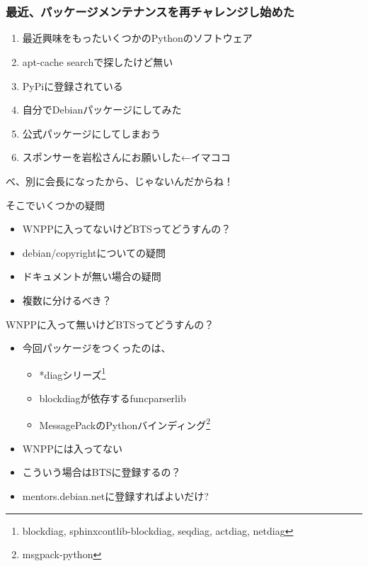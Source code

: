 \frame{\titlepage{}}

\section{}

\begin{frame}
 \frametitle{最近、パッケージメンテナンスを再チャレンジし始めた}
  \begin{enumerate}
   \item 最近興味をもったいくつかのPythonのソフトウェア
   \item apt-cache searchで探したけど無い
   \item PyPiに登録されている
   \item 自分でDebianパッケージにしてみた
   \item 公式パッケージにしてしまおう
   \item スポンサーを岩松さんにお願いした←イマココ
  \end{enumerate}
 {\large べ、別に会長になったから、じゃないんだからね！}
\end{frame}

\begin{frame}{そこでいくつかの疑問}
 \begin{itemize}
  \item WNPPに入ってないけどBTSってどうすんの？
  \item debian/copyrightについての疑問
  \item ドキュメントが無い場合の疑問
  \item 複数に分けるべき？
 \end{itemize}
\end{frame}

\begin{frame}{WNPPに入って無いけどBTSってどうすんの？}
\begin{itemize}
 \item 今回パッケージをつくったのは、
       \begin{itemize}
	\item *diagシリーズ\footnote{blockdiag,
       sphinxcontlib-blockdiag, seqdiag, actdiag, netdiag}
	\item blockdiagが依存するfuncparserlib
	\item MessagePackのPythonバインディング\footnote{msgpack-python}
       \end{itemize}
 \item WNPPには入ってない
 \item こういう場合はBTSに登録するの？
 \item mentors.debian.netに登録すればよいだけ?
       \end{itemize}
\end{frame}

